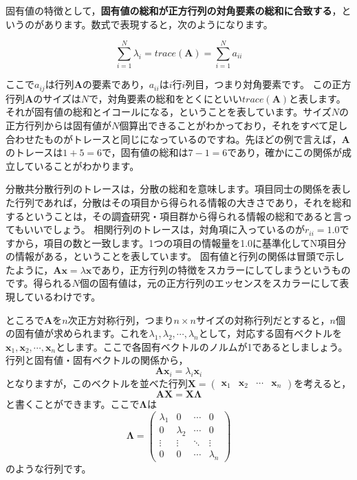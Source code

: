 \documentclass{ltjsbook}
\begin{document}
固有値の特徴として，\textbf{固有値の総和が正方行列の対角要素の総和に合致する}，というのがあります。数式で表現すると，次のようになります。

\[ \sum_{i=1}^N \lambda_i = trace(\bm{A}) = \sum_{i=1}^N a_{ii} \]

ここで$a_{ij}$は行列$\bm{A}$の要素であり，$a_{ii}$は$i$行$i$列目，つまり対角要素です。
この正方行列$\bm{A}$のサイズは$N$で，対角要素の総和をとくにといい$trace(\bm{A})$と表します。
それが固有値の総和とイコールになる，ということを表しています。サイズ$N$の正方行列からは固有値が$N$個算出できることがわかっており，それをすべて足し合わせたものがトレースと同じになっているのですね。先ほどの例で言えば，$\bm{A}$のトレースは$1+5=6$で，固有値の総和は$7-1=6$であり，確かにこの関係が成立していることがわかります。

分散共分散行列のトレースは，分散の総和を意味します。項目同士の関係を表した行列であれば，分散はその項目から得られる情報の大きさであり，それを総和するということは，その調査研究・項目群から得られる情報の総和であると言ってもいいでしょう。
相関行列のトレースは，対角項に入っているのが$r_{ii}=1.0$ですから，項目の数と一致します。1つの項目の情報量を1.0に基準化してN項目分の情報がある，ということを表しています。
固有値と行列の関係は冒頭で示したように，$\bm{Ax}=\lambda \bm{x}$であり，正方行列の特徴をスカラーにしてしまうというものです。得られる$N$個の固有値は，元の正方行列のエッセンスをスカラーにして表現しているわけです。


ところで$\bm{A}$を$n$次正方対称行列，つまり$n \times n$サイズの対称行列だとすると，$n$個の固有値が求められます。これを$\lambda_1,\lambda_2,\cdots,\lambda_n$として，対応する固有ベクトルを$\bm{x}_1,\bm{x}_2,\cdots,\bm{x}_n$とします。ここで各固有ベクトルのノルムが1であるとしましょう。行列と固有値・固有ベクトルの関係から，
\[ \bm{Ax}_i = \lambda_i\bm{x}_i\]
となりますが，このベクトルを並べた行列$\bm{X}=\begin{pmatrix}\bm{x}_1&\bm{x}_2& \cdots & \bm{x}_n\end{pmatrix}$を考えると，
\[ \bm{AX} = \bm{X \Lambda} \]
と書くことができます。ここで$\bm{\Lambda}$は
\[ \bm{\Lambda} =
    \begin{pmatrix} \lambda_1 & 0         & \cdots & 0         \\
                0         & \lambda_2 & \cdots & 0         \\
                \vdots    & \vdots    & \ddots & \vdots    \\
                0         & 0         & \cdots & \lambda_n\end{pmatrix}
\]
のような行列です。
\end{document}
